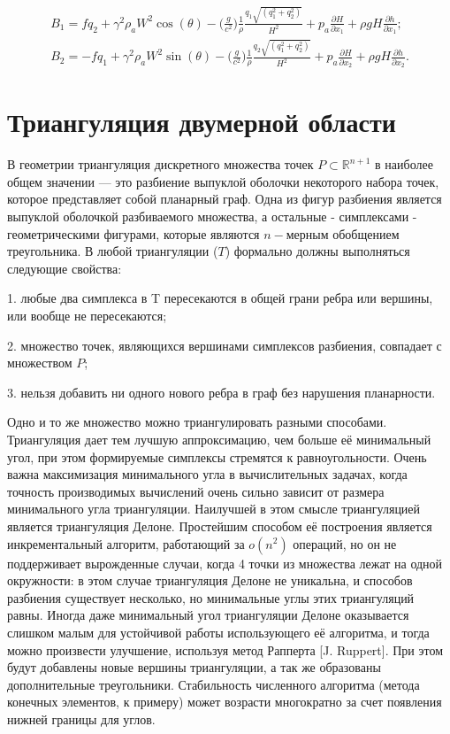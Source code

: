 \documentclass[14pt]{extreport}
\begin{document}

\begin{equation}\label{eq:shallow_water:23}
\begin{aligned}
B_1=fq_2+\gamma^2\rho_aW^2\cos(\theta)-\bigg(\frac{g}{c^2}\bigg)\frac{1}{\rho}\frac{q_1\sqrt{(q_1^2+q_2^2)}}{H^2} + p_a \frac{\partial H}{\partial x_1} + \rho gH\frac{\partial h}{\partial x_1}; \\
B_2=-fq_1+\gamma^2\rho_aW^2\sin(\theta)-\bigg(\frac{g}{c^2}\bigg)\frac{1}{\rho}\frac{q_2\sqrt{(q_1^2+q_2^2)}}{H^2} + p_a \frac{\partial H}{\partial x_2} + \rho gH\frac{\partial h}{\partial x_2}.
\end{aligned}
\end{equation}


\section{Триангуляция двумерной области}

В геометрии триангуляция дискретного множества точек $P\subset {\mathbb  {R}}^{{n+1}}$ в наиболее общем значении — это разбиение  выпуклой оболочки некоторого набора точек, которое представляет собой планарный граф. Одна из фигур разбиения является выпуклой оболочкой разбиваемого множества, а остальные - симплексами -  геометрическими фигурами, которые являются $n-$мерным обобщением треугольника. В любой триангуляции ($T$) формально должны выполняться следующие свойства:

	1. любые два симплекса в T пересекаются в общей грани ребра или вершины, или вообще не пересекаются;

	2. множество точек, являющихся вершинами симплексов разбиения, совпадает с множеством $P$;
	
	3. нельзя добавить ни одного нового ребра в граф без нарушения планарности.

Одно и то же множество можно триангулировать разными способами. Триангуляция дает тем лучшую аппроксимацию, чем больше её минимальный угол, при этом формируемые симплексы стремятся к равноугольности. Очень важна максимизация минимального угла в вычислительных задачах, когда точность производимых вычислений очень сильно зависит от размера минимального угла триангуляции. Наилучшей в этом смысле триангуляцией является триангуляция Делоне. Простейшим способом её построения является инкрементальный алгоритм, работающий за $o(n^2)$ операций, но он не поддерживает вырожденные случаи, когда 4 точки из множества лежат на одной окружности: в этом случае триангуляция Делоне не уникальна, и способов разбиения существует несколько, но минимальные углы этих триангуляций равны. Иногда даже минимальный угол триангуляции Делоне оказывается слишком малым для устойчивой работы использующего её алгоритма, и тогда можно произвести улучшение, используя метод Рапперта [J. Ruppert]. При этом будут добавлены новые вершины триангуляции, а так же образованы дополнительные треугольники. Стабильность численного алгоритма (метода конечных элементов, к примеру) может возрасти многократно за счет появления нижней границы для углов. 
\end{document}
